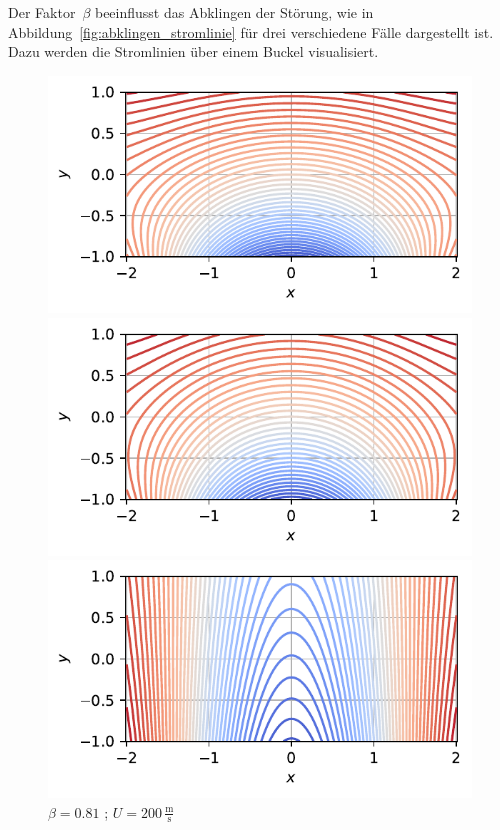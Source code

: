 Der Faktor~$\beta$ beeinflusst das Abklingen der Störung,
wie in Abbildung~\ref{fig:abklingen_stromlinie} 
für drei verschiedene Fälle dargestellt ist.
Dazu werden die Stromlinien über einem Buckel visualisiert.
\begin{figure}
    \centering
    \begin{minipage}[b]{0.32\textwidth}
        \centering
        \includegraphics[width=\linewidth]{papers/ueberschall/figures/abklingen_10.pdf}
        \caption*{$\beta = 1$ ; $U = 10\,\frac{\mathrm{m}}{\mathrm{s}}$}
    \end{minipage}
    \hfill
    \begin{minipage}[b]{0.32\textwidth}
        \centering
        \includegraphics[width=\linewidth]{papers/ueberschall/figures/abklingen_200.pdf}
        \caption*{$\beta = 0.81$ ; $U = 200\,\frac{\mathrm{m}}{\mathrm{s}}$}
    \end{minipage}
    \hfill
    \begin{minipage}[b]{0.32\textwidth}
        \centering
        \includegraphics[width=\linewidth]{papers/ueberschall/figures/abklingen_340.pdf}

\end{minipage}
\end{figure}
